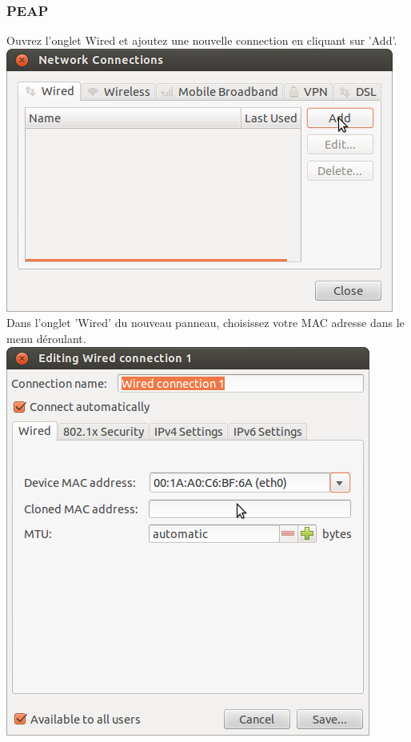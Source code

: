 \subsubsection{PEAP}
Ouvrez l'onglet Wired et ajoutez une nouvelle connection en cliquant sur 'Add'.\\
\includegraphics[width=\screenShotSize{}]{img/wiredAdd.png}\\
Dans l'onglet 'Wired' du nouveau panneau, choisissez votre MAC adresse dans le menu déroulant.\\
\includegraphics[width=\screenShotSize{}]{img/setMac.png}\\
